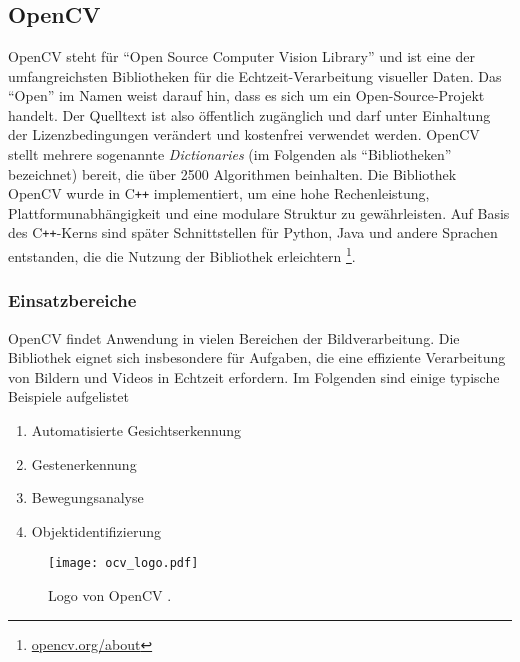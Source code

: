 \chapter{\chapTwo}
\label{sec:kapitel2} %

\begingroup
\fontsize{12pt}{14pt}\selectfont

\section{OpenCV}
\label{sec:ocv} %
OpenCV steht für \enquote{Open Source Computer Vision Library} und ist eine der umfangreichsten Bibliotheken für die Echtzeit-Verarbeitung visueller Daten. Das \enquote{Open} im Namen weist darauf hin, dass es sich um ein Open-Source-Projekt handelt. Der Quelltext ist also öffentlich zugänglich und darf unter Einhaltung der Lizenzbedingungen verändert und kostenfrei verwendet werden. OpenCV stellt mehrere sogenannte \textit{Dictionaries} (im Folgenden als \enquote{Bibliotheken} bezeichnet) bereit, die über 2500 Algorithmen beinhalten.
Die Bibliothek OpenCV wurde in C\texttt{++} implementiert, um eine hohe Rechenleistung, Plattformunabhängigkeit und eine modulare Struktur zu gewährleisten. Auf Basis des C\texttt{++}-Kerns sind später Schnittstellen für Python, Java und andere Sprachen entstanden, die die Nutzung der Bibliothek erleichtern \cite{ocv:org}\footnote{\url{opencv.org/about}}.

\subsection{Einsatzbereiche}
OpenCV findet Anwendung in vielen Bereichen der Bildverarbeitung. Die Bibliothek eignet sich insbesondere für Aufgaben, die eine effiziente Verarbeitung von Bildern und Videos in Echtzeit erfordern. 
Im Folgenden sind einige typische Beispiele aufgelistet \cite{Wiki:ocv}

\begin{minipage}{0.55\textwidth}
    \begin{enumerate}
        \item Automatisierte Gesichtserkennung
        \item Gestenerkennung
        \item Bewegungsanalyse
        \item Objektidentifizierung
    \end{enumerate}
\end{minipage}
\hfill
\begin{minipage}{0.4\textwidth}
    \begin{figure}[H]
        \centering
            \texttt{[image: ocv\_logo.pdf]}
        \caption{Logo von OpenCV \cite{ocv:org}.}
            \label{fig:ocv_logo}
    \end{figure}
\end{minipage}

